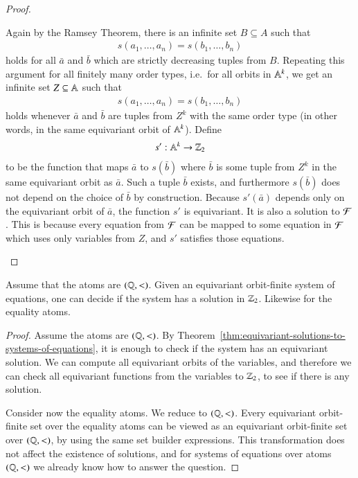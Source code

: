 \begin{proof}
\begin{enumerate}
Again by the Ramsey Theorem, there is an infinite set $B \subseteq A$ such that \begin{align*}
 s(a_1,\ldots,a_n) = s(b_1,\ldots,b_n) 
\end{align*}
holds for all $\bar a$ and $\bar b$ which are strictly decreasing tuples from $B$. 
Repeating this argument for all finitely many order types, i.e.~for all orbits in $\mathbb A^k$, we get an infinite set $Z \subseteq \mathbb A$ such that 
\begin{align*}
 s(a_1,\ldots,a_n) = s(b_1,\ldots,b_n) 
\end{align*}
holds whenever $\bar a$ and $\bar b$ are tuples from $Z^k$ with the same order type (in other words, in the same equivariant orbit of $\mathbb A^k$). Define 
\begin{align*}
 s' : \mathbb A^k \to {\mathbb Z}_2
\end{align*}
to be the function that maps $\bar a$ to $s(\bar b)$ where $\bar b$ is some tuple from $Z^k$ in the same equivariant orbit as $\bar a$. Such a tuple $\bar b$ exists, and furthermore $s(\bar b)$ does not depend on the choice of $\bar b$ by construction. Because $s'(\bar a)$ depends only on the equivariant orbit of $\bar a$, the function $s'$ is equivariant. It is also a solution to ${\mathcal F}$. This is because every equation from ${\mathcal F}$ can be mapped to some equation in ${\mathcal F}$ which uses only variables from $Z$, and $s'$ satisfies those equations. 
 \end{enumerate}
 
\end{proof}


\begin{corollary}
 Assume that the atoms are $(\mathbb Q, <)$. Given an equivariant orbit-finite system of equations, one can decide if the system has a solution in ${\mathbb Z}_2$. Likewise for the equality atoms. 
\end{corollary}
\begin{proof}
 Assume the atoms are $(\mathbb Q, <)$. 
 By Theorem~\ref{thm:equivariant-solutions-to-systems-of-equations}, it is enough to check if the system has an equivariant solution. We can compute all equivariant orbits of the variables, and therefore we can check all equivariant functions from the variables to ${\mathbb Z}_2$, to see if there is any solution.

 Consider now the equality atoms. We reduce to $(\mathbb Q, <)$. Every equivariant orbit-finite set over the equality atoms can be viewed as an equivariant orbit-finite set over $(\mathbb Q, <)$, by using the same set builder expressions. This transformation does not affect the existence of solutions, and for systems of equations over atoms $(\mathbb Q, <)$ we already know how to answer the question. 
\end{proof}


